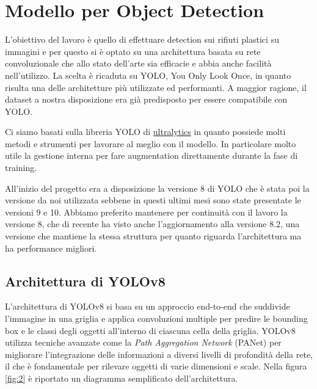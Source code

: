 \section{Modello per Object Detection}

L'obiettivo del lavoro è quello di effettuare detection sui rifiuti plastici
su immagini e per questo si è optato su una architettura basata su rete convoluzionale che allo stato dell'arte sia efficacie e abbia anche 
facilità nell'utilizzo. La scelta è ricaduta su YOLO, You Only Look Once, in
quanto risulta una delle architetture più utilizzate ed performanti.
A maggior ragione, il dataset a nostra disposizione era già predisposto per 
essere compatibile con YOLO.

Ci siamo basati sulla libreria YOLO di \href{https://docs.ultralytics.com/}{ultralytics} in quanto possiede molti metodi e strumenti per lavorare al meglio con il modello. In particolare molto utile la gestione interna per 
fare augmentation direttamente durante la fase di training.

All'inizio del progetto era a disposizione la versione 8 di YOLO che è stata
poi la versione da noi utilizzata sebbene in questi ultimi mesi sono state 
presentate le versioni 9 e 10. Abbiamo preferito mantenere per continuità con il lavoro la versione 8, che di recente ha visto anche l'aggiornamento
alla versione 8.2, una versione che mantiene la stessa struttura per quanto
riguarda l'architettura ma ha performance migliori.



\subsection*{Architettura di YOLOv8}

L'architettura di YOLOv8 si basa su un approccio end-to-end che suddivide l'immagine in una griglia e applica convoluzioni multiple per predire le bounding box e le classi degli oggetti all'interno di ciascuna cella della griglia. YOLOv8 utilizza tecniche avanzate come la \textit{Path Aggregation Network} (PANet) per migliorare l'integrazione delle informazioni a diversi livelli di profondità della rete, il che è fondamentale per rilevare oggetti di varie dimensioni e scale. Nella figura \ref*{fig:2} è riportato un diagramma semplificato dell'architettura.

